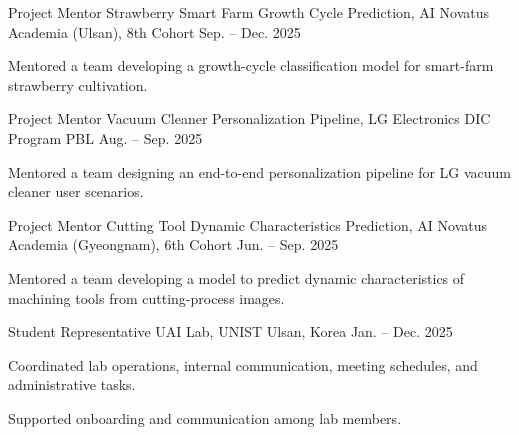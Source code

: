 \documentclass[11pt, a4paper]{awesome-cv}
\begin{document}
\begin{cventries}
  \cventry
    {Project Mentor}
    {Strawberry Smart Farm Growth Cycle Prediction, AI Novatus Academia (Ulsan), 8th Cohort}
    {}
    {Sep. -- Dec. 2025}
    {
      \begin{cvitems}
        \item {Mentored a team developing a growth-cycle classification model for smart-farm strawberry cultivation.}
      \end{cvitems}
    }
  \cventry
    {Project Mentor}
    {Vacuum Cleaner Personalization Pipeline, LG Electronics DIC Program PBL}
    {}
    {Aug. -- Sep. 2025}
    {
      \begin{cvitems}
        \item {Mentored a team designing an end-to-end personalization pipeline for LG vacuum cleaner user scenarios.}
      \end{cvitems}
    }
  \cventry
    {Project Mentor}
    {Cutting Tool Dynamic Characteristics Prediction, AI Novatus Academia (Gyeongnam), 6th Cohort}
    {}
    {Jun. -- Sep. 2025}
    {
      \begin{cvitems}
        \item {Mentored a team developing a model to predict dynamic characteristics of machining tools from cutting-process images.}
      \end{cvitems}
    }
\end{cventries}

\begin{cventries}
  \cventry
    {Student Representative}
    {UAI Lab, UNIST}
    {Ulsan, Korea}
    {Jan. -- Dec. 2025}
    {
      \begin{cvitems}
        \item {Coordinated lab operations, internal communication, meeting schedules, and administrative tasks.}
        \item {Supported onboarding and communication among lab members.}
      \end{cvitems}
    }
\end{cventries}

\begin{cvskills}
\end{cvskills}
\end{document}
